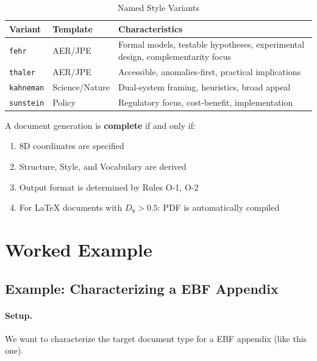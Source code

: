 \begin{table}[htbp]
\centering
\caption{Named Style Variants}
\label{tab:style-variants}
\renewcommand{\arraystretch}{1.3}
\begin{tabular}{@{}llp{6cm}@{}}
\toprule
\textbf{Variant} & \textbf{Template} & \textbf{Characteristics} \\
\midrule
\texttt{fehr} & AER/JPE & Formal models, testable hypotheses, experimental design, complementarity focus \\
\texttt{thaler} & AER/JPE & Accessible, anomalies-first, practical implications \\
\texttt{kahneman} & Science/Nature & Dual-system framing, heuristics, broad appeal \\
\texttt{sunstein} & Policy & Regulatory focus, cost-benefit, implementation \\
\bottomrule
\end{tabular}
\end{table}

\begin{tcolorbox}[colback=green!5!white, colframe=green!75!black,
    title=Axiom O-1: Output Completeness]
A document generation is \textbf{complete} if and only if:
\begin{enumerate}[nosep]
\item 8D coordinates are specified
\item Structure, Style, and Vocabulary are derived
\item Output format is determined by Rules O-1, O-2
\item For LaTeX documents with $D_8 > 0.5$: PDF is automatically compiled
\end{enumerate}
\end{tcolorbox}


\section{Worked Example}
\label{sec:doctype-example}

\subsection{Example: Characterizing a EBF Appendix}

\paragraph{Setup.} We want to characterize the target document type for a
EBF appendix (like this one).


